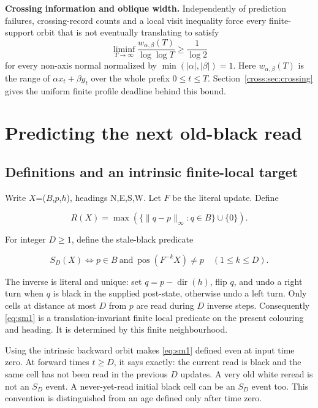 \documentclass[
  11pt,
]{article}
\begin{document}
\textbf{Crossing information and oblique width.} Independently of prediction
failures, crossing-record counts and a local visit inequality force every
finite-support orbit that is not eventually translating to satisfy
\[
\liminf_{T\to\infty}\frac{w_{\alpha,\beta}(T)}{\log\log T}\ge\frac1{\log2}
\]
for every non-axis normal normalized by $\min(|\alpha|,|\beta|)=1$.
Here $w_{\alpha,\beta}(T)$ is the range of $\alpha x_t+\beta y_t$ over the
whole prefix $0\le t\le T$. Section~\ref{cross:sec:crossing} gives the uniform
finite profile deadline behind this bound.

\section{Predicting the next old-black
read}\label{predicting-the-next-old-black-read}

\subsection{Definitions and an intrinsic finite-local
target}\label{sm-1}

Write \(X\)=(\(B\),\(p\),\(h\)), headings N,E,S,W. Let \(F\) be the literal update. Define

\[
R(X)=\max(\{\|q-p\|_\infty:q\in B\}\cup\{0\}).
\]

For integer $D\ge1$, define the stale-black predicate

\begin{equation}\label{eq:sm1}
S_D(X)\iff p\in B\ \text{and}\ \operatorname{pos}(F^{-k}X)\ne p\quad(1\le k\le D).
\end{equation}

The inverse is literal and unique: set \(q=p-\operatorname{dir}(h)\), flip \(q\), and undo a right
turn when \(q\) is black in the supplied post-state, otherwise undo a left
turn. Only cells at distance at most \(D\) from \(p\) are read during \(D\) inverse
steps. Consequently \eqref{eq:sm1} is a translation-invariant finite local predicate on the present colouring and heading. It is determined by this finite neighbourhood.

Using the intrinsic backward orbit makes \eqref{eq:sm1} defined even at input
time zero. At forward times $t\ge D$, it says exactly: the
current read is black and the same cell has not been read in the
previous \(D\) updates. A very old white reread is not an $S_D$ event. A
never-yet-read initial black cell can be an $S_D$ event too. This
convention is distinguished from an age defined only after time zero.
\end{document}
